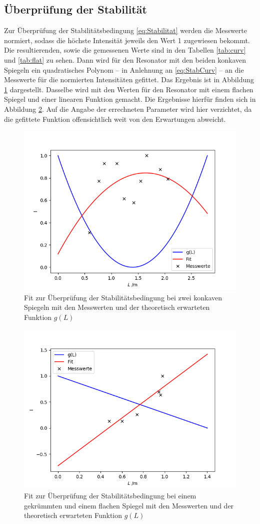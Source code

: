\subsection{Überprüfung der Stabilität}
Zur Überprüfung der Stabilitätsbedingung \eqref{eq:Stabilitat} werden die Messwerte normiert, sodass die höchste Intensität jeweils den Wert 1 zugewiesen bekommt. Die resultierenden, sowie die gemessenen Werte sind in den Tabellen \ref{tab:curv} und \ref{tab:flat} zu sehen. Dann wird für den Resonator mit den beiden konkaven Spiegeln ein quadratisches Polynom -- in Anlehnung an \eqref{eq:StabCurv} -- an die Messwerte für die normierten Intensitäten gefittet. Das Ergebnis ist in Abbildung \ref{fig:fitcurved} dargestellt. Dasselbe wird mit den Werten für den Resonator mit einem flachen Spiegel und einer linearen Funktion gemacht. Die Ergebnisse hierfür finden sich in Abbildung \ref{fig:fitflat}. Auf die Angabe der errechneten Parameter wird hier verzichtet, da die gefittete Funktion offensichtlich weit von den Erwartungen abweicht.

\begin{figure}[h!]
	\centering
	\includegraphics[width=.6\textwidth]{FitCurved.png}
	\caption{Fit zur Überprüfung der Stabilitätsbedingung bei zwei konkaven Spiegeln mit den Messwerten und der theoretisch erwarteten Funktion $g(L)$}
	\label{fig:fitcurved}
\end{figure}

\begin{figure}[h!]
	\centering
	\includegraphics[width=.6\textwidth]{FitFlat.png}
	\caption{Fit zur Überprüfung der Stabilitätsbedingung bei einem gekrümmten und einem flachen Spiegel mit den Messwerten und der theoretisch erwarteten Funktion $g(L)$}
	\label{fig:fitflat}
\end{figure}